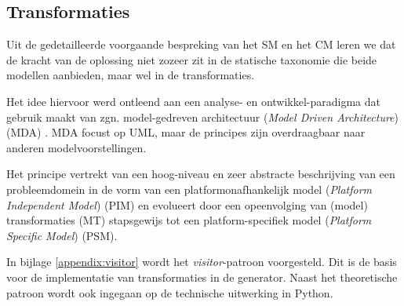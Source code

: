 
\subsection{Transformaties}
\label{subsection:devel-transformations}

Uit de gedetailleerde voorgaande bespreking van het SM en het CM leren we dat
de kracht van de oplossing niet zozeer zit in de statische taxonomie die beide
modellen aanbieden, maar wel in de transformaties.

Het idee hiervoor werd ontleend aan een analyse- en ontwikkel-paradigma dat
gebruik maakt van zgn. model-gedreven architectuur (\emph{Model Driven
Architecture}) (MDA) \citep{soley2000model,kleppe2003mda}. MDA focust op UML,
maar de principes zijn overdraagbaar naar anderen modelvoorstellingen.

Het principe vertrekt van een hoog-niveau en zeer abstracte beschrijving van
een probleemdomein in de vorm van een platformonafhankelijk model
(\emph{Platform Independent Model}) (PIM) en evolueert door een opeenvolging
van (model) transformaties (MT) stapsgewijs tot een platform-specifiek model
(\emph{Platform Specific Model}) (PSM).

In bijlage \ref{appendix:visitor} wordt het \emph{visitor}-patroon voorgesteld.
Dit is de basis voor de implementatie van transformaties in de generator. Naast
het theoretische patroon wordt ook ingegaan op de technische uitwerking in
Python.
